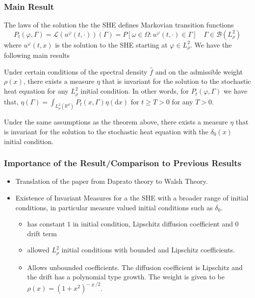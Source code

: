 \documentclass[11pt]{beamer}
\numberwithin{equation}{section}
\newcommand{\R}{\mathbb{R}}
\newcommand{\ud}{\ensuremath{\mathrm{d}}}
\begin{document}
\begin{frame}[t]
	\frametitle{Main Result}
	The laws of the solution the the SHE defines Markovian transition functions
	\[
	P_t(\varphi , \Gamma) = \mathscr L (u^\varphi(t,\cdot))(\Gamma) = P[\omega \in \Omega : u^\varphi(t,\cdot)\in \Gamma] \quad \Gamma \in \mathscr B (L^2_\rho)
	\]
	where $u^\varphi(t,x)$ is the solution to the SHE starting at $\varphi \in L^2_\rho$. We have the following main results
	\begin{theorem}
		Under certain conditions of the spectral density $\hat{f}$ and on the admissible weight $\rho(x)$, there exists a measure $\eta$ that is invariant for the solution to the stochastic heat equation for any $L^2_\rho$ initial condition. In other words, for $P_t(\varphi,\Gamma)$ we have that, $ \eta(\Gamma) = \int_{L^2_\rho(\R^d)}P_t(x,\Gamma)\eta( \ud x) $ for $ t\ge T >0$ for any $T>0$.
	\end{theorem}

	\begin{theorem}
		Under the same assumptions as the theorem above, there exists a measure $\eta$ that is invariant for the solution to the stochastic heat equation with the $\delta_0(x)$ initial condition.
	\end{theorem}

\end{frame}

\begin{frame}[t]
	\frametitle{Importance of the Result/Comparison to Previous Results}
	
	\begin{itemize}
		\item 	Translation of the paper \cite{TessitoreZabczyk98M} from Daprato theory to Walsh Theory.
		
		\item Existence of Invariant Measures for a the SHE with a broader range of initial conditions, in particular measure valued initial conditions such as $\delta_0$. 
			\begin{itemize}
				\item \cite{TessitoreZabczyk98M} has constant $1$ in initial condition, Lipschitz diffusion coefficient and 0 drift term  
				\item \cite{MSY16} allowed $L^2_\rho$ initial conditions with bounded and Lipschitz coefficients.
				\item \cite{AM2002} Allows unbounded coefficients. The diffusion coefficient is Lipschitz and the drift has a polynomial type growth. The weight is given to be $\rho(x) = (1+x^2)^{-\varrho/2}$.
			\end{itemize}
	\end{itemize}

\end{frame}
\end{document}
